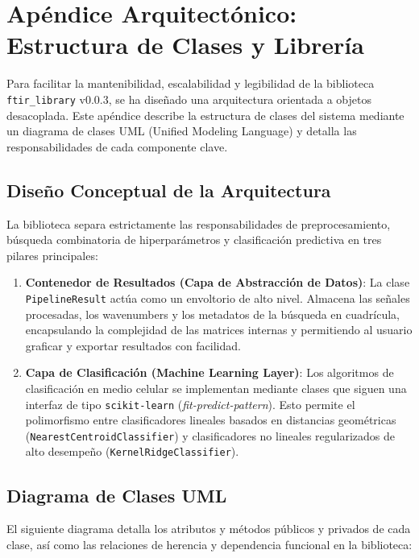 \section{Apéndice Arquitectónico: Estructura de Clases y Librería}
Para facilitar la mantenibilidad, escalabilidad y legibilidad de la biblioteca \texttt{ftir\_library} v0.0.3, se ha diseñado una arquitectura orientada a objetos desacoplada. Este apéndice describe la estructura de clases del sistema mediante un diagrama de clases UML (Unified Modeling Language) y detalla las responsabilidades de cada componente clave.

\subsection{Diseño Conceptual de la Arquitectura}
La biblioteca separa estrictamente las responsabilidades de preprocesamiento, búsqueda combinatoria de hiperparámetros y clasificación predictiva en tres pilares principales:
\begin{enumerate}
    \item \textbf{Contenedor de Resultados (Capa de Abstracción de Datos)}: La clase \texttt{PipelineResult} actúa como un envoltorio de alto nivel. Almacena las señales procesadas, los wavenumbers y los metadatos de la búsqueda en cuadrícula, encapsulando la complejidad de las matrices internas y permitiendo al usuario graficar y exportar resultados con facilidad.
    \item \textbf{Capa de Clasificación (Machine Learning Layer)}: Los algoritmos de clasificación en medio celular se implementan mediante clases que siguen una interfaz de tipo \texttt{scikit-learn} (\textit{fit-predict-pattern}). Esto permite el polimorfismo entre clasificadores lineales basados en distancias geométricas (\texttt{NearestCentroidClassifier}) y clasificadores no lineales regularizados de alto desempeño (\texttt{KernelRidgeClassifier}).
\end{enumerate}

\subsection{Diagrama de Clases UML}
El siguiente diagrama detalla los atributos y métodos públicos y privados de cada clase, así como las relaciones de herencia y dependencia funcional en la biblioteca:

